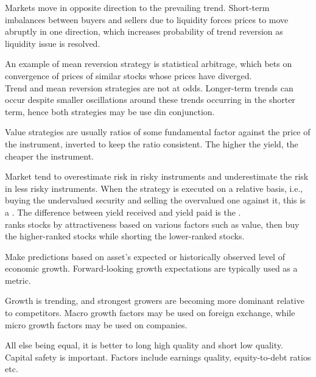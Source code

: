 \begin{definition}
 Markets move in opposite direction to the prevailing trend. Short-term imbalances between buyers and sellers due to liquidity forces prices to move abruptly in one direction, which increases probability of trend reversion as liquidity issue is resolved.
\end{definition}
An example of mean reversion strategy is statistical arbitrage, which bets on convergence of prices of similar stocks whose prices have diverged.\\

Trend and mean reversion strategies are not at odds. Longer-term trends can occur despite smaller oscillations around these trends occurring in the shorter term, hence both strategies may be use din conjunction.\\

\begin{definition}
 Value strategies are usually ratios of some fundamental factor against the price of the instrument, inverted to keep the ratio consistent. The higher the yield, the cheaper the instrument.
\end{definition}
Market tend to overestimate risk in risky instruments and underestimate the risk in less risky instruments. When the strategy is executed on a relative basis, i.e., buying the undervalued security and selling the overvalued one against it, this is a . The difference between yield received and yield paid is the .\\

 ranks stocks by attractiveness based on various factors such as value, then buy the higher-ranked stocks while shorting the lower-ranked stocks.

\begin{definition}
 Make predictions based on asset's expected or historically observed level of economic growth. Forward-looking growth expectations are typically used as a metric.
\end{definition}
Growth is trending, and strongest growers are becoming more dominant relative to competitors. Macro growth factors may be used on foreign exchange, while micro growth factors may be used on companies.

\begin{definition}
 All else being equal, it is better to long high quality and short low quality. Capital safety is important. Factors include earnings quality, equity-to-debt ratios etc.
\end{definition}

